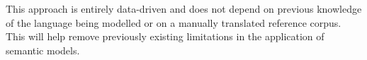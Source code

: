\documentclass{article} %
\begin{document}
This approach is entirely data-driven and does not depend on previous knowledge of the language being modelled or on a manually translated reference corpus. This will help remove previously existing limitations in the application of semantic models.

%   
%
%
%
% 
%
%
%
%



\end{document}
